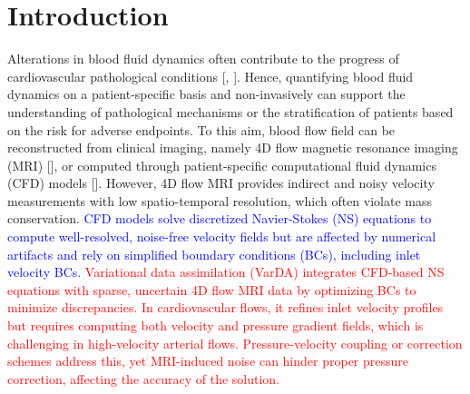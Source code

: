 \section*{Introduction}
Alterations in blood fluid dynamics often contribute to the progress of cardiovascular pathological conditions [\cite{Bappoo2021}, \cite{Guzzardi2015}]. Hence, quantifying blood fluid dynamics on a patient-specific basis and non-invasively can support the understanding of pathological mechanisms or the stratification of patients based on the risk for adverse endpoints. To this aim, blood flow field can be reconstructed from clinical imaging, namely 4D flow magnetic resonance imaging (MRI) [\cite{Dyverfeldt2015}], or computed through patient-specific computational fluid dynamics (CFD) models  [\cite{Kheyfets2015}]. 
However, 4D flow MRI provides indirect and noisy velocity measurements with low spatio-temporal resolution, which often violate mass conservation. \textcolor{blue}{CFD models solve discretized Navier-Stokes (NS) equations to compute well-resolved, noise-free velocity fields but are affected by numerical artifacts and rely on simplified boundary conditions (BCs), including inlet velocity BCs.}  
\textcolor{red}{Variational data assimilation (VarDA) integrates CFD-based NS equations with sparse, uncertain 4D flow MRI data by optimizing BCs to minimize discrepancies. In cardiovascular flows, it refines inlet velocity profiles but requires computing both velocity and pressure gradient fields, which is challenging in high-velocity arterial flows. Pressure-velocity coupling or correction schemes address this, yet MRI-induced noise can hinder proper pressure correction, affecting the accuracy of the solution.}

